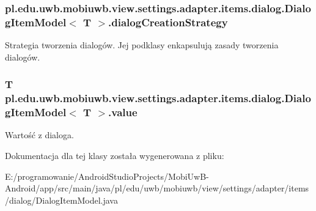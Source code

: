 \subsubsection[{dialog\+Creation\+Strategy}]{ {\bf pl.\+edu.\+uwb.\+mobiuwb.\+view.\+settings.\+adapter.\+items.\+dialog.\+Dialog\+Item\+Model}$<$ T $>$.dialog\+Creation\+Strategy\hspace{0.3cm}{\ttfamily [protected]}}\label{classpl_1_1edu_1_1uwb_1_1mobiuwb_1_1view_1_1settings_1_1adapter_1_1items_1_1dialog_1_1_dialog_item_model_a69815392e79418b2ef8dec9eb184be44}
Strategia tworzenia dialogów. Jej podklasy enkapsulują zasady tworzenia dialogów. \hypertarget{classpl_1_1edu_1_1uwb_1_1mobiuwb_1_1view_1_1settings_1_1adapter_1_1items_1_1dialog_1_1_dialog_item_model_a6fc8d7f0a0759f12346fdd34666aaf39}{}
\subsubsection[{value}]{\setlength{\rightskip}{0pt plus 5cm}T {\bf pl.\+edu.\+uwb.\+mobiuwb.\+view.\+settings.\+adapter.\+items.\+dialog.\+Dialog\+Item\+Model}$<$ T $>$.value\hspace{0.3cm}{\ttfamily [protected]}}\label{classpl_1_1edu_1_1uwb_1_1mobiuwb_1_1view_1_1settings_1_1adapter_1_1items_1_1dialog_1_1_dialog_item_model_a6fc8d7f0a0759f12346fdd34666aaf39}
Wartość z dialoga. 

Dokumentacja dla tej klasy została wygenerowana z pliku\+:\begin{DoxyCompactItemize}
\item 
E\+:/programowanie/\+Android\+Studio\+Projects/\+Mobi\+Uw\+B-\/\+Android/app/src/main/java/pl/edu/uwb/mobiuwb/view/settings/adapter/items/dialog/Dialog\+Item\+Model.\+java\end{DoxyCompactItemize}
